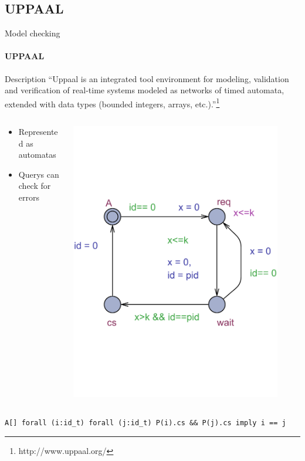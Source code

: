 \subsection{UPPAAL}
\begin{frame}[t]{Model checking}
	\framesubtitle{UPPAAL}
	
	\begin{block}{Description}
		\footnotesize 
		``Uppaal is an integrated tool environment for modeling, 
		validation and verification of real-time systems modeled as networks of timed automata, 
		extended with data types (bounded integers, arrays, etc.).''\footnote{http://www.uppaal.org/}
	\end{block}
	
	\begin{columns}[T]
		\begin{column}{.48\textwidth}
			\begin{itemize}
				\item Represented as automatas
				\item Querys can check for errors
			\end{itemize}
		\end{column}
		\begin{column}{.48\textwidth}
			\includegraphics[trim=0 200 0 200,width=0.90\textwidth]{images/P.pdf}
		\end{column}
	\end{columns}
	\medskip
	\texttt{A[] forall (i:id\_t) forall (j:id\_t) P(i).cs \&\& P(j).cs imply i == j}
\end{frame}

